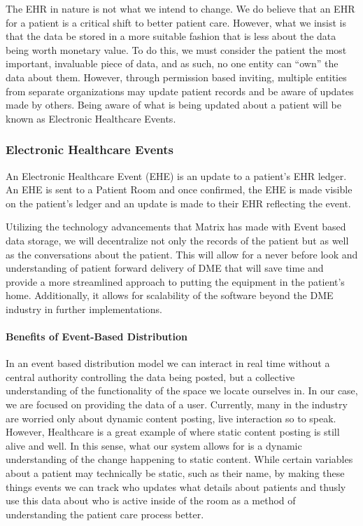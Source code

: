 \documentclass[preprint,pre,floats,aps,amsmath,amssymb]{revtex4-1}
\begin{document}
The EHR in nature is not what we intend to change. We do believe that an EHR for a patient is a critical shift to better patient care. However, what we insist is that the data be stored in a more suitable fashion that is less about the data being worth monetary value. To do this, we must consider the patient the most important, invaluable piece of data, and as such, no one entity can “own” the data about them. However, through permission based inviting, multiple entities from separate organizations may update patient records and be aware of updates made by others. Being aware of what is being updated about a patient will be known as Electronic Healthcare Events.

  \subsubsection{Electronic Healthcare Events}
  An Electronic Healthcare Event (EHE) is an update to a patient’s EHR ledger. An EHE is sent to a Patient Room and once confirmed, the EHE is made visible on the patient’s ledger and an update is made to their EHR reflecting the event.

  Utilizing the technology advancements that Matrix has made with Event based data storage, we will decentralize not only the records of the patient but as well as the conversations about the patient. This will allow for a never before look and understanding of patient forward delivery of DME that will save time and provide a more streamlined approach to putting the equipment in the patient's home. Additionally, it allows for scalability of the software beyond the DME industry in further implementations.

    \paragraph{Benefits of Event-Based Distribution}
    In an event based distribution model we can interact in real time without a central authority controlling the data being posted, but a collective understanding of the functionality of the space we locate ourselves in. In our case, we are focused on providing the data of a user. Currently, many in the industry are worried only about dynamic content posting, live interaction so to speak. However, Healthcare is a great example of where static content posting is still alive and well. In this sense, what our system allows for is a dynamic understanding of the change happening to static content. While certain variables about a patient may technically be static, such as their name, by making these things events we can track who updates what details about patients and thusly use this data about who is active inside of the room as a method of understanding the patient care process better.
\end{document}
